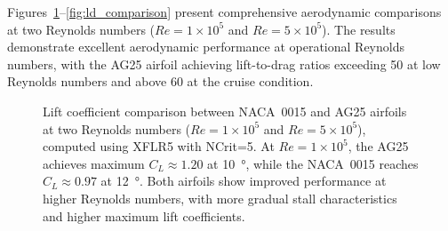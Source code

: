 Figures~\ref{fig:cl_comparison}--\ref{fig:ld_comparison} present comprehensive aerodynamic comparisons at two Reynolds numbers ($Re=1\times10^5$ and $Re=5\times10^5$).
The results demonstrate excellent aerodynamic performance at operational Reynolds numbers, with the AG25 airfoil achieving lift-to-drag ratios exceeding 50 at low Reynolds numbers and above 60 at the cruise condition.

\begin{figure}[htbp]
\centering

\caption{Lift coefficient comparison between NACA~0015 and AG25 airfoils at two Reynolds numbers ($Re=1\times10^5$ and $Re=5\times10^5$), computed using XFLR5 with NCrit=5. At $Re=1\times10^5$, the AG25 achieves maximum \(C_L \approx 1.20\) at \SI{10}{\degree}, while the NACA~0015 reaches \(C_L \approx 0.97\) at \SI{12}{\degree}. Both airfoils show improved performance at higher Reynolds numbers, with more gradual stall characteristics and higher maximum lift coefficients.}
\label{fig:cl_comparison}
\end{figure}

